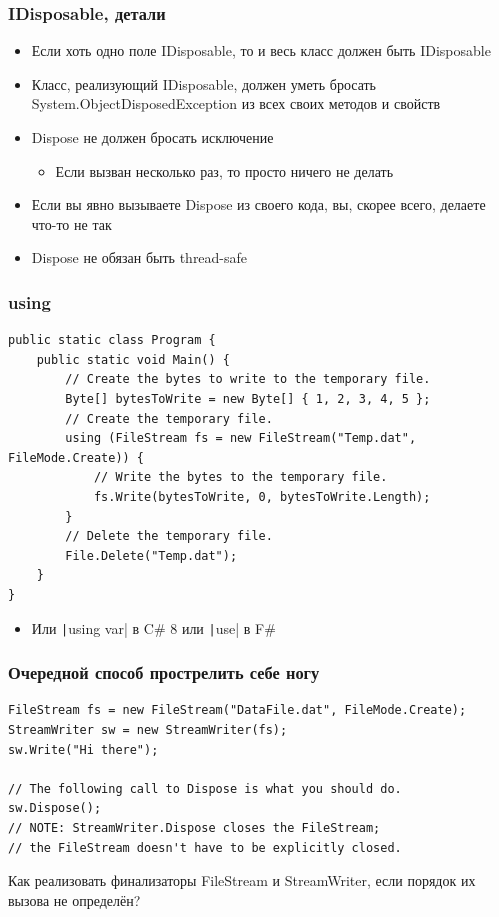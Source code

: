 \documentclass{../../slides-style}
\begin{document}
    \begin{frame}
        \frametitle{IDisposable, детали}
        \begin{itemize}
            \item Если хоть одно поле IDisposable, то и весь класс должен быть IDisposable
            \item Класс, реализующий IDisposable, должен уметь бросать System.ObjectDisposedException из всех своих методов и свойств
            \item Dispose не должен бросать исключение
            \begin{itemize}
                \item Если вызван несколько раз, то просто ничего не делать
            \end{itemize}
            \item Если вы явно вызываете Dispose из своего кода, вы, скорее всего, делаете что-то не так
            \item Dispose не обязан быть thread-safe
        \end{itemize}
    \end{frame}

    \begin{frame}[fragile]
        \frametitle{using}
        \begin{scriptsize}
            \begin{verbatim}
public static class Program {
    public static void Main() {
        // Create the bytes to write to the temporary file.
        Byte[] bytesToWrite = new Byte[] { 1, 2, 3, 4, 5 };
        // Create the temporary file.
        using (FileStream fs = new FileStream("Temp.dat", FileMode.Create)) {
            // Write the bytes to the temporary file.
            fs.Write(bytesToWrite, 0, bytesToWrite.Length);
        }
        // Delete the temporary file.
        File.Delete("Temp.dat");
    }
}
            \end{verbatim}
        \end{scriptsize}
        \begin{itemize}
            \item Или \texttt|using var| в C\# 8 или \texttt|use| в F\#
        \end{itemize}
    \end{frame}

    \begin{frame}[fragile]
        \frametitle{Очередной способ прострелить себе ногу}
        \begin{verbatim}
FileStream fs = new FileStream("DataFile.dat", FileMode.Create);
StreamWriter sw = new StreamWriter(fs);
sw.Write("Hi there");

// The following call to Dispose is what you should do.
sw.Dispose();
// NOTE: StreamWriter.Dispose closes the FileStream;
// the FileStream doesn't have to be explicitly closed.
        \end{verbatim}
        Как реализовать финализаторы FileStream и StreamWriter, если порядок их вызова не определён?
    \end{frame}
\end{document}
